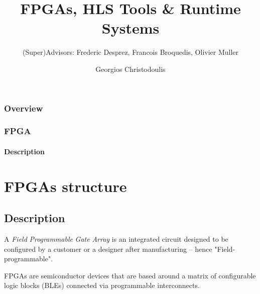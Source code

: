 \documentclass{beamer}
\title[George Christodoulis]{FPGAs, HLS Tools \& Runtime Systems} %
\subtitle{{\fontsize{8}{6}\selectfont (Super)Advisors: Frederic Desprez, Francois Broquedis, Olivier Muller}}
\author{Georgios Christodoulis} %
\institute[NTUA] %
{
CORSE$-$LIG\\ %
\medskip
\textit{gchristodoulis@gmail.com} %
}
\date{}
\begin{document}
\begin{frame}
\titlepage %
\end{frame}

\begin{frame}
\frametitle{Overview} %
\begin{multicols}{2}
\tableofcontents %
\end{multicols}
\end{frame}
\begin{frame}
\frametitle{FPGA}
\framesubtitle{Description}
\section{FPGAs structure}
\subsection{Description}

\par{A \emph{\alert{F}ield} \emph{\alert{P}rogrammable} \emph{\alert{G}ate} \emph{\alert{A}rray} is an integrated circuit designed to be configured by a customer or a designer after manufacturing – hence "Field-programmable".}

\par{\alert{FPGA}s are semiconductor devices that are based around a matrix of configurable logic blocks (BLEs) connected via programmable interconnects.}

\end{frame}
\end{document}
